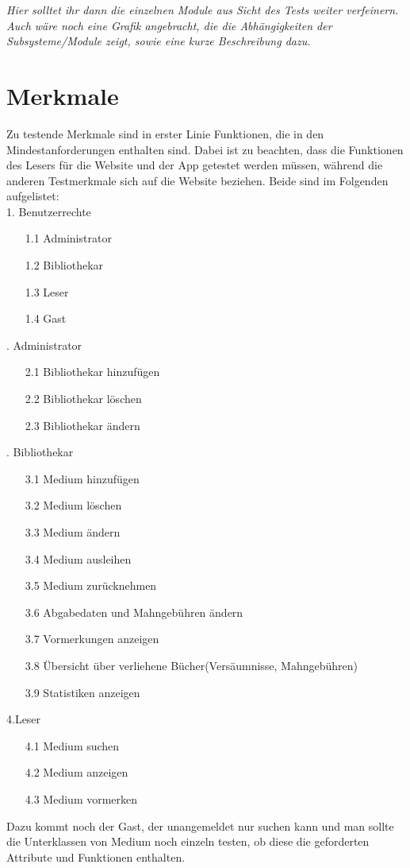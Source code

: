 \documentclass[fontsize=12pt,paper=a4,twoside]{scrartcl}
\begin{document}
{\em Hier solltet ihr dann die einzelnen Module aus Sicht des
Tests weiter verfeinern. Auch wäre noch eine Grafik angebracht, die
die Abhängigkeiten der Subsysteme/Module zeigt, sowie eine kurze
Beschreibung dazu.}


\clearpage

\section{Merkmale}

Zu testende Merkmale sind in erster Linie Funktionen, die in den Mindestanforderungen enthalten sind. Dabei ist zu beachten, dass die Funktionen des Lesers für die Website und der App getestet werden müssen, während die anderen Testmerkmale sich auf die Website beziehen. Beide sind im Folgenden aufgelistet:\\

1. Benutzerrechte\\
\begin{itemize}
\item[1.1]Administrator 
\item[1.2]Bibliothekar 
\item[1.3]Leser 
\item[1.4]Gast
\end{itemize}
. Administrator\\
\begin{itemize}
\item[2.1]Bibliothekar hinzufügen
\item[2.2]Bibliothekar löschen
\item[2.3]Bibliothekar ändern
\end{itemize}
. Bibliothekar\\
\begin{itemize}
\item[3.1]Medium hinzufügen
\item[3.2]Medium löschen
\item[3.3]Medium ändern
\item[3.4]Medium ausleihen
\item[3.5]Medium zurücknehmen
\item[3.6]Abgabedaten und Mahngebühren ändern
\item[3.7]Vormerkungen anzeigen
\item[3.8]Übersicht über verliehene Bücher(Versäumnisse, Mahngebühren)
\item[3.9]Statistiken anzeigen
\end{itemize}
\bigskip
4.Leser\\
\begin{itemize}
\item[4.1]Medium suchen
\item[4.2]Medium anzeigen
\item[4.3]Medium vormerken
\end{itemize}
\bigskip
Dazu kommt noch der Gast, der unangemeldet nur suchen kann und man sollte die Unterklassen von Medium noch einzeln testen, ob diese die geforderten Attribute und Funktionen enthalten.
\end{document}
